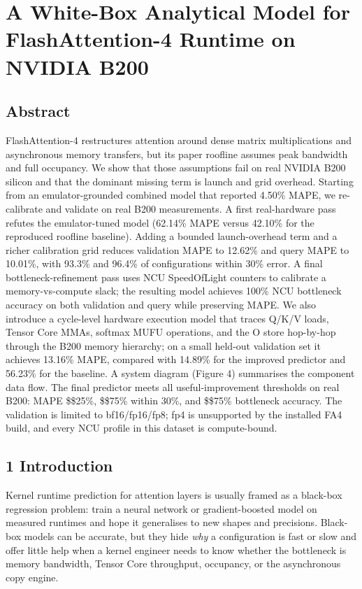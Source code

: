 \section{A White-Box Analytical Model for FlashAttention-4 Runtime on
NVIDIA
B200}\label{a-white-box-analytical-model-for-flashattention-4-runtime-on-nvidia-b200}

\subsection{Abstract}\label{abstract}

FlashAttention-4 restructures attention around dense matrix
multiplications and asynchronous memory transfers, but its paper
roofline assumes peak bandwidth and full occupancy. We show that those
assumptions fail on real NVIDIA B200 silicon and that the dominant
missing term is launch and grid overhead. Starting from an
emulator-grounded combined model that reported 4.50\% MAPE, we
re-calibrate and validate on real B200 measurements. A first
real-hardware pass refutes the emulator-tuned model (62.14\% MAPE versus
42.10\% for the reproduced roofline baseline). Adding a bounded
launch-overhead term and a richer calibration grid reduces validation
MAPE to 12.62\% and query MAPE to 10.01\%, with 93.3\% and 96.4\% of
configurations within 30\% error. A final bottleneck-refinement pass
uses NCU SpeedOfLight counters to calibrate a memory-vs-compute slack;
the resulting model achieves 100\% NCU bottleneck accuracy on both
validation and query while preserving MAPE. We also introduce a
cycle-level hardware execution model that traces Q/K/V loads, Tensor
Core MMAs, softmax MUFU operations, and the O store hop-by-hop through
the B200 memory hierarchy; on a small held-out validation set it
achieves 13.16\% MAPE, compared with 14.89\% for the improved predictor
and 56.23\% for the baseline. A system diagram (Figure 4) summarises the
component data flow. The final predictor meets all useful-improvement
thresholds on real B200: MAPE \$\le\$25\%, \$\ge\$75\% within 30\%, and
\$\ge\$75\% bottleneck accuracy. The validation is limited to
bf16/fp16/fp8; fp4 is unsupported by the installed FA4 build, and every
NCU profile in this dataset is compute-bound.

\subsection{1 Introduction}\label{introduction}

Kernel runtime prediction for attention layers is usually framed as a
black-box regression problem: train a neural network or gradient-boosted
model on measured runtimes and hope it generalises to new shapes and
precisions. Black-box models can be accurate, but they hide \emph{why} a
configuration is fast or slow and offer little help when a kernel
engineer needs to know whether the bottleneck is memory bandwidth,
Tensor Core throughput, occupancy, or the asynchronous copy engine.


